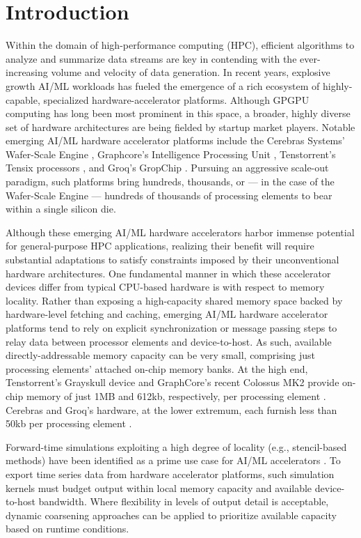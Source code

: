 \section{Introduction} \label{sec:introduction}

Within the domain of high-performance computing (HPC), efficient algorithms to analyze and summarize data streams are key in contending with the ever-increasing volume and velocity of data generation.
In recent years, explosive growth AI/ML workloads has fueled the emergence of a rich ecosystem of highly-capable, specialized hardware-accelerator platforms.
Although GPGPU computing has long been most prominent in this space, a broader, highly diverse set of hardware architectures are being fielded by startup market players.
Notable emerging AI/ML hardware accelerator platforms include the Cerebras Systems' Wafer-Scale Engine \citep{lie2023cerebras}, Graphcore's Intelligence Processing Unit \citep{gepner2024performance}, Tenstorrent's Tensix processors \citep{vasiljevic2021compute}, and Groq's GropChip \citep{abts2022groq}.
Pursuing an aggressive scale-out paradigm, such platforms bring hundreds, thousands, or --- in the case of the Wafer-Scale Engine --- hundreds of thousands of processing elements to bear within a single silicon die.

Although these emerging AI/ML hardware accelerators harbor immense potential for general-purpose HPC applications, realizing their benefit will require substantial adaptations to satisfy constraints imposed by their unconventional hardware architectures.
One fundamental manner in which these accelerator devices differ from typical CPU-based hardware is with respect to memory locality.
Rather than exposing a high-capacity shared memory space backed by hardware-level fetching and caching, emerging AI/ML hardware accelerator platforms tend to rely on explicit synchronization or message passing steps to relay data between processor elements and device-to-host.
As such, available directly-addressable memory capacity can be very small, comprising just processing elements' attached on-chip memory banks.
At the high end, Tenstorrent's Grayskull device and GraphCore's recent Colossus MK2 provide on-chip memory of just 1MB and 612kb, respectively, per processing element \citep{vasiljevic2021compute,gepner2024performance}.
Cerebras and Groq's hardware, at the lower extremum, each furnish less than 50kb per processing element \citep{lie2023cerebras,abts2022groq}.

Forward-time simulations exploiting a high degree of locality (e.g., stencil-based methods) have been identified as a prime use case for AI/ML accelerators \citep{jacquelin2022scalable,brown2023exploring,brown2024accelerating,louw2021using}.
To export time series data from hardware accelerator platforms, such simulation kernels must budget output within local memory capacity and available device-to-host bandwidth.
Where flexibility in levels of output detail is acceptable, dynamic coarsening approaches can be applied to prioritize available capacity based on runtime conditions.

